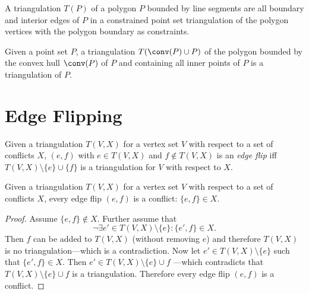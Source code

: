 
\begin{definition}
  A triangulation \(T(P)\) of a polygon \(P\) bounded by line segments
  are all boundary and interior edges of \(P\) in a constrained point
  set triangulation of the polygon vertices with the polygon boundary
  as constraints.
\end{definition}


\begin{theorem}
  Given a point set \(P\), a triangulation \(T(\conv(P) \cup P)\) of
  the polygon bounded by the convex hull \(\conv(P)\) of \(P\) and
  containing all inner points of \(P\) is a triangulation of \(P\).
\end{theorem}

\section{Edge Flipping}


\begin{definition}
  \label{def:edge_flip}
  Given a triangulation \(T(V,X)\) for a vertex set \(V\) with respect
  to a set of conflicts \(X\), \((e, f)\) with \(e \in T(V,X)\) and
  \(f \not\in T(V,X)\) is an \emph{edge flip} iff
  \(T(V,X) \setminus \{e\} \cup \{f\}\) is a triangulation for \(V\)
  with respect to \(X\).
\end{definition}


\begin{theorem}
  Given a triangulation \(T(V,X)\) for a vertex set \(V\) with respect
  to a set of conflicts \(X\), every edge flip \((e,f)\) is a
  conflict: \(\{e,f\} \in X\).
\end{theorem}

\begin{proof}
  Assume \(\{e,f\} \not\in X\). Further assume that
  \[ \lnot\exists e' \in T(V,X)\setminus\{e\}: \{e', f\} \in X. \]
  Then \(f\) can be added to \(T(V,X)\) (without removing \(e\)) and
  therefore \(T(V,X)\) is no triangulation---which is a 
  contradiction. Now let \(e' \in T(V,X)\setminus\{e\}\) such that
  \(\{e', f\} \in X\). Then \(e' \in T(V,X)\setminus\{e\} \cup f\)
  ---which contradicts that \(T(V,X)\setminus\{e\} \cup f\) is a
  triangulation. Therefore every edge flip \((e,f)\) is a conflict.
\end{proof}

